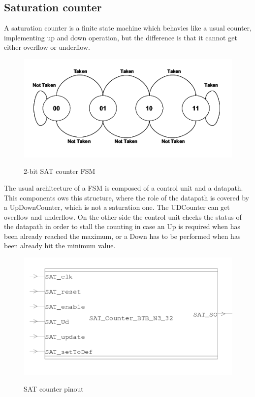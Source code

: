 \subsection{Saturation counter}
A saturation counter is a finite state machine which behavies like a usual counter, implementing up and down operation, but the difference is that it cannot get either overflow or underflow. 
\begin{figure}[H]
\centering
\includegraphics[scale=.8]{Immagini/15}
\label{15}
\caption{2-bit SAT counter FSM}
\end{figure}
The usual architecture of a FSM is composed of a control unit and a datapath. This components ows this structure, where the role of the datapath is covered by a UpDownCounter, which is not a saturation one. The UDCounter can get overflow and underflow. On the other side the control unit checks the status of the datapath in order to stall the counting in case an Up is required when has been already reached the maximum, or a Down has to be performed when has been already hit the minimum value.
\begin{figure}[H]
\centering
\includegraphics[scale=.8]{Immagini/16}
\label{16}
\caption{SAT counter pinout}
\end{figure}

